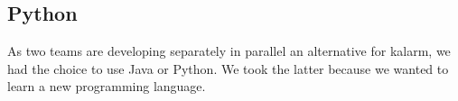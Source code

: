 \subsection{Python}
As two teams are developing separately in parallel an alternative for \gls{kalarm}, we had the choice to use Java or Python. We took the latter because we wanted to learn a new programming language.